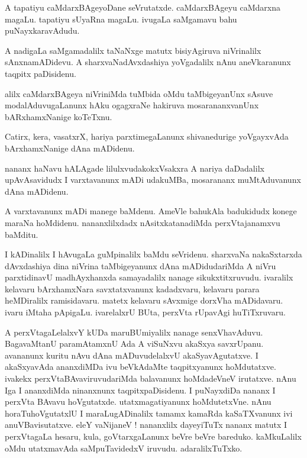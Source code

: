 \documentclass{article}
\begin{document}
\begin{mn}%
A tapatiyu caMdarxBAgeyoDane seVrutatxde. caMdarxBAgeyu caMdarxna magaLu. tapatiyu sUyaRna magaLu. 
ivugaLa saMgamavu bahu puNayxkaravAdudu.
\end{mn}

\begin{mn}%
A nadigaLa saMgamadalilx taNaNxge matutx bisiyAgiruva niVrinalilx sAnxnamADidevu. A 
sharxvaNadAvxdashiya yoVgadalilx nAnu aneVkaranunx taqpitx paDisidenu.
\end{mn}

\begin{mn}%
alilx caMdarxBAgeya niVriniMda tuMbida oMdu taMbigeyanUnx sAsuve modalAduvugaLanunx hAku ogagxraNe 
hakiruva mosarananxvanUnx bARxhamxNanige koTeTxnu.
\end{mn}

\begin{mn}%
Catirx, kera, vasatxrX, hariya parxtimegaLanunx shivanedurige yoVgayxvAda bArxhamxNanige dAna 
mADidenu.
\end{mn}

\begin{mn}%
nananx haNavu hALAgade lilulxvudakokxVsakxra A nariya daDadalilx upAvAsavidudx I varxtavanunx mADi 
udakuMBa, mosarananx muMtAduvanunx dAna mADidenu.
\end{mn}

\begin{mn}%
A varxtavanunx mADi manege baMdenu. AmeVle bahukAla badukidudx konege maraNa hoMdidenu. 
nananxlilxdadx nAsitxkatanadiMda perxVtajanamxvu baMditu.
\end{mn}

\begin{mn}%
I kADinalilx I hAvugaLa guMpinalilx baMdu seVridenu. sharxvaNa nakaSxtarxda dAvxdashiya dina 
niVrina taMbigeyanunx dAna mADidudariMda A niVru parxtidinavU madhAyxhanxda samayadalilx nanage 
sikukxtitxruvudu. ivaralilx kelavaru bArxhamxNara savxtatxvanunx kadadxvaru, kelavaru parara 
heMDiralilx ramisidavaru. matetx kelavaru sAvxmige dorxVha mADidavaru. ivaru iMtaha pApigaLu. 
ivarelalxrU BUta, perxVta rUpavAgi huTiTxruvaru.
\end{mn}

\begin{mn}%
A perxVtagaLelalxvY kUDa maruBUmiyalilx nanage senxVhavAduvu. BagavaMtanU paramAtamxnU Ada A 
viSuNxvu akaSxya savxrUpanu. avananunx kuritu nAvu dAna mADuvudelalxvU akaSyavAgutatxve. I 
akaSxyavAda ananxdiMDa ivu beVkAdaMte taqpitxyanunx hoMdutatxve. ivakekx perxVtaBAvaviruvudariMda 
balavanunx hoMdadeVneV irutatxve. nAnu Iga I ananxdiMda ninanxnunx taqpitxpaDisidenu. I puNayxdiDa 
nananx I perxVta BAvavu hoVgutatxde. utatxmagatiyanunx hoMdutetxVne. nAnu horaTuhoVgutatxlU I 
maraLugADinalilx tamamx kamaRda kaSaTXvanunx ivi anuVBavisutatxve. eleY vaNijaneV ! nananxlilx 
dayeyiTuTx nananx matutx I perxVtagaLa hesaru, kula, goVtarxgaLanunx beVre beVre bareduko. 
kaMkuLalilx oMdu utatxmavAda saMpuTavidedxV iruvudu. adaralilxTuTxko.
\end{mn}
\end{document}
